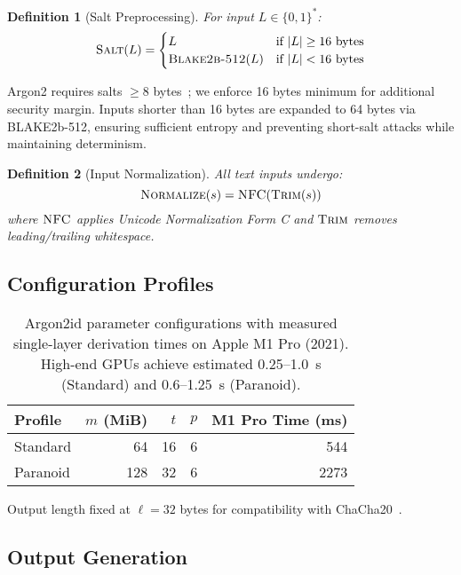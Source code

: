 \documentclass[11pt]{article}
\newtheorem{definition}{Definition}
\begin{document}
\begin{definition}[Salt Preprocessing]
For input $L \in \{0,1\}^*$:
\begin{equation}
\textsc{Salt}(L) = 
\begin{cases}
L & \text{if } |L| \geq 16 \text{ bytes} \\
\textsc{Blake2b-512}(L) & \text{if } |L| < 16 \text{ bytes}
\end{cases}
\end{equation}
\end{definition}

Argon2 requires salts $\geq 8$ bytes~\cite{rfc9106}; we enforce 16 bytes minimum for additional security margin. Inputs shorter than 16 bytes are expanded to 64 bytes via BLAKE2b-512, ensuring sufficient entropy and preventing short-salt attacks while maintaining determinism.

\begin{definition}[Input Normalization]
All text inputs undergo:
\begin{equation}
\textsc{Normalize}(s) = \textsc{NFC}(\textsc{Trim}(s))
\end{equation}
where $\textsc{NFC}$ applies Unicode Normalization Form C and $\textsc{Trim}$ removes leading/trailing whitespace.
\end{definition}

\subsection{Configuration Profiles}

\begin{table}[H]
\centering
\begin{tabular}{@{}lrrrr@{}}
\toprule
\textbf{Profile} & $m$ (MiB) & $t$ & $p$ & \textbf{M1 Pro Time (ms)} \\
\midrule
Standard & 64 & 16 & 6 & 544 \\
Paranoid & 128 & 32 & 6 & 2273 \\
\bottomrule
\end{tabular}
\caption{Argon2id parameter configurations with measured single-layer derivation times on Apple M1 Pro (2021). High-end GPUs achieve estimated 0.25--1.0~s (Standard) and 0.6--1.25~s (Paranoid).}
\label{tab:profiles}
\end{table}

Output length fixed at $\ell = 32$ bytes for compatibility with ChaCha20~\cite{rfc8439}.

\subsection{Output Generation}
\end{document}
